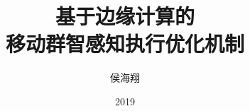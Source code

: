\documentclass[format=draft,language=chinese,degree=phd,table,usenames,dvipsnames]{hustthesis}
\title{基于边缘计算的\\移动群智感知执行优化机制}{Execution Optimization Mechanisms for \protect{\\} Edge Computing empowered Mobile Crowdsensing}
\author{侯海翔}{Haixiang Hou}
\date{2019}{6}{1}
\begin{document}
\frontmatter
\maketitle
\makeabstract
\tableofcontents
\listoffigures
\listoftables
\mainmatter













\begin{ack}





\end{ack}
\end{document}
